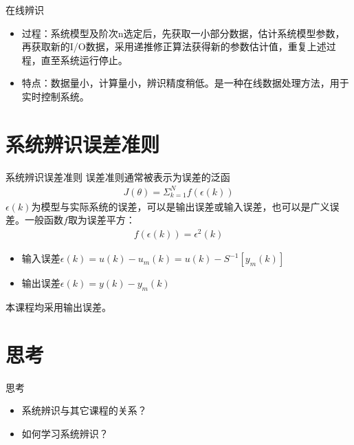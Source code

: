 \begin{frame}{在线辨识}
\begin{itemize}
\item 过程：系统模型及阶次n选定后，先获取一小部分数据，估计系统模型参数，再获取新的I/O数据，采用递推修正算法获得新的参数估计值，重复上述过程，直至系统运行停止。
\item 特点：数据量小，计算量小，辨识精度稍低。是一种在线数据处理方法，用于实时控制系统。
\end{itemize}
\end{frame}

\section{系统辨识误差准则}
\begin{frame}{系统辨识误差准则}
误差准则通常被表示为误差的泛函
\begin{eqnarray}
J(\theta)=\Sigma_{k=1}^Nf(\epsilon(k))
\end{eqnarray} 
$\epsilon(k)$为模型与实际系统的误差，可以是输出误差或输入误差，也可以是广义误差。一般函数$f$取为误差平方：
\begin{eqnarray}
f(\epsilon(k))=\epsilon^2(k)
\end{eqnarray}
\begin{itemize}
\item 输入误差$\epsilon(k)=u(k)-u_m(k)=u(k)-S^{-1}[y_m(k)]$
\item 输出误差$\epsilon(k)=y(k)-y_m(k)$
\end{itemize}
本课程均采用输出误差。
\end{frame}


\section{思考}
\begin{frame}{思考}
\begin{itemize}
\item 系统辨识与其它课程的关系？
\item 如何学习系统辨识？
\end{itemize}
\end{frame}



